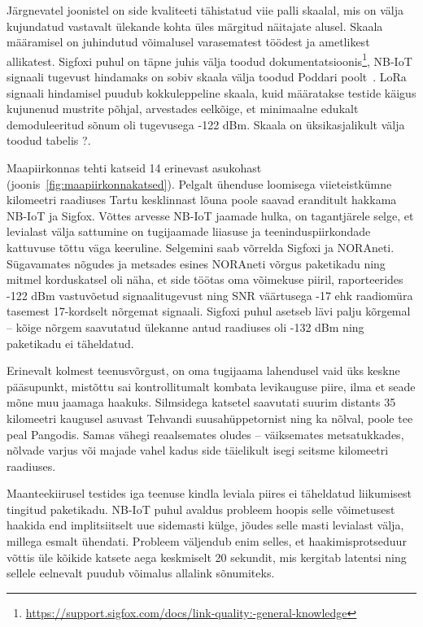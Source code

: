 \documentclass[12pt]{article}
\begin{document}
    Järgnevatel joonistel on side kvaliteeti tähistatud viie palli skaalal, mis on välja kujundatud vastavalt ülekande kohta üles märgitud näitajate alusel.
    Skaala määramisel on juhindutud võimalusel varasematest töödest ja ametlikest allikatest.
    Sigfoxi puhul on täpne juhis välja toodud dokumentatsioonis\footnote{\url{https://support.sigfox.com/docs/link-quality:-general-knowledge}}, NB-IoT signaali tugevust hindamaks on sobiv skaala välja toodud Poddari poolt~\cite{poddar2020}.
    LoRa signaali hindamisel puudub kokkuleppeline skaala, kuid määratakse testide käigus kujunenud mustrite põhjal, arvestades eelkõige, et minimaalne edukalt demoduleeritud sõnum oli tugevusega -122 dBm.
    Skaala on üksikasjalikult välja toodud tabelis ?.

    Maapiirkonnas tehti katseid 14 erinevast asukohast (joonis~\ref{fig:maapiirkonnakatsed}). Pelgalt ühenduse loomisega viieteistkümne kilomeetri raadiuses Tartu kesklinnast lõuna poole saavad eranditult hakkama NB-IoT ja Sigfox.
    Võttes arvesse NB-IoT jaamade hulka, on tagantjärele selge, et levialast välja sattumine on tugijaamade liiasuse ja teeninduspiirkondade kattuvuse tõttu väga keeruline.
    Selgemini saab võrrelda Sigfoxi ja NORAneti.
    Sügavamates nõgudes ja metsades esines NORAneti võrgus paketikadu ning mitmel korduskatsel oli näha, et side töötas oma võimekuse piiril, raporteerides -122 dBm vastuvõetud signaalitugevust ning SNR väärtusega -17 ehk raadiomüra tasemest 17-kordselt nõrgemat signaali.
    Sigfoxi puhul asetseb lävi palju kõrgemal -- kõige nõrgem saavutatud ülekanne antud raadiuses oli -132 dBm ning paketikadu ei täheldatud.

    Erinevalt kolmest teenusvõrgust, on oma tugijaama lahendusel vaid üks keskne pääsupunkt, mistõttu sai kontrollitumalt kombata levikauguse piire, ilma et seade mõne muu jaamaga haakuks.
    Silmsidega katsetel saavutati suurim distants 35 kilomeetri kaugusel asuvast Tehvandi suusahüppetornist ning ka nõlval, poole tee peal Pangodis.
    Samas vähegi reaalsemates oludes -- väiksemates metsatukkades, nõlvade varjus või majade vahel kadus side täielikult isegi seitsme kilomeetri raadiuses.

    Maanteekiirusel testides iga teenuse kindla leviala piires ei täheldatud liikumisest tingitud paketikadu.
    NB-IoT puhul avaldus probleem hoopis selle võimetusest haakida end implitsiitselt uue sidemasti külge, jõudes selle masti levialast välja, millega esmalt ühendati.
    Probleem väljendub enim selles, et haakimisprotseduur võttis üle kõikide katsete aega keskmiselt 20 sekundit, mis kergitab latentsi ning sellele eelnevalt puudub võimalus allalink sõnumiteks.
\end{document}
